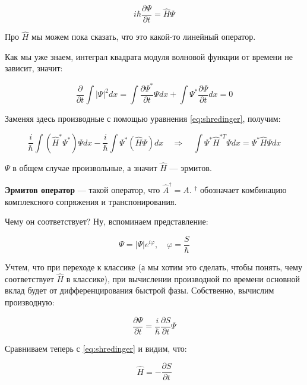\documentclass[a4paper, 12pt]{article}
\newcommand{\qrq}
{\ensuremath{\quad \Rightarrow \quad}} %
\renewcommand{\phi}{\varphi} %
\begin{document}
\begin{equation}
	i \hbar \frac{\partial \Psi}{\partial t} = \hat{H} \Psi
	\label{eq:shredinger}
\end{equation}

Про $\hat{H}$ мы можем пока сказать, что это какой-то линейный оператор.

Как мы уже знаем, интеграл квадрата модуля волновой функции от времени не зависит, значит:

\begin{equation*}
	\frac{\partial}{\partial t} \int |\Psi|^2 dx = \int \frac{\partial \Psi^*}{\partial t} \Psi dx + \int\Psi^* \frac{\partial \Psi}{\partial t} dx = 0
\end{equation*}

Заменяя здесь производные с помощью уравнения \ref{eq:shredinger}, получим:

\begin{equation}
	\frac{i}{\hbar}\int (\hat{H}^*\Psi^*)\Psi dx - \frac{i}{\hbar} \int \Psi^* (\hat{H}\Psi) dx \qrq \int \Psi^* \hat{H}^{*T} \Psi dx = \Psi^* \hat{H} \Psi dx
\end{equation}

$\Psi$ в общем случае произвольные, а значит $\hat{H}$ --- эрмитов.

\textbf{Эрмитов оператор} --- такой оператор, что $\hat{A}^\dagger = A$. $^\dagger$ обозначает комбинацию комплексного сопряжения и транспонирования.

Чему он соответствует? Ну, вспоминаем представление:

\begin{equation*}
	\Psi = |\Psi| e^{i\phi}, \quad \phi = \frac{S}{\hbar}
\end{equation*}

Учтем, что при переходе к классике (а мы хотим это сделать, чтобы понять, чему соответствует $\hat{H}$ в классике), при вычислении производной по времени основной вклад будет от дифференцирования быстрой фазы. Собственно, вычислим производную:

\begin{equation*}
	\frac{\partial \Psi}{\partial t} = \frac{i}{\hbar}\frac{\partial S}{\partial t} \Psi
\end{equation*}

Сравниваем теперь с \ref{eq:shredinger} и видим, что:

\begin{equation*}
	\hat{H} = -\frac{\partial S}{\partial t}
\end{equation*}
\end{document}
